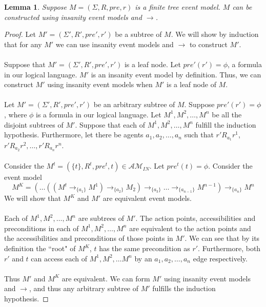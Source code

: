 \documentclass[12pt, a4paper, titlepage]{scrartcl}
\newtheorem{lemma}{Lemma}[subsection]
\numberwithin{equation}{section}
\newcommand{\eventClass}{\mathcal{AM}}
\newcommand{\insaneClass}{\eventClass_{IN}}
\begin{document}
\begin{lemma} \label{finTreeConstruct}
Suppose $M = (\Sigma, R, pre, r)$ is a finite tree event model.
$M$ can be constructed using insanity event models and $\to$.
\end{lemma}
\begin{proof}
Let $M' = (\Sigma', R', pre', r')$ be a subtree of $M$.
We will show by induction that for any $M'$ we can use insanity event models and $\to$ to
construct $M'$.\\
\\
Suppose that $M' = (\Sigma', R', pre', r')$ is a leaf node.
Let $pre'(r') = \phi$, a formula in our logical language.
$M'$ is an insanity event model by definition.
Thus, we can construct $M'$ using insanity event models when $M'$ is a leaf node of $M$.\\
\\
Let $M' = (\Sigma', R', pre', r')$ be an arbitrary subtree of $M$.
Suppose $pre'(r') = \phi$, where $\phi$ is a formula in our logical language.
Let $M^1, M^2, \ldots, M^n$ be all the disjoint subtrees of $M'$.
Suppose that each of $M^1, M^2, \ldots, M^n$ fulfill the induction hypothesis.
Furthermore, let there be agents $a_1, a_2, \ldots, a_n$ such that $r' R_{a_1} r^1$, $r' R_{a_2} r^2,
	\ldots, r' R_{a_n} r^n$.\\
\\
Consider the $M^t = (\{ t \}, R^t, pre^t, t) \in \insaneClass$.
Let $pre^t(t) = \phi$.
Consider the event model 
\[
M^K = (\ldots((M^t \to_{\{a_1\}} M ^ 1) \to_{\{a_2\}} M_2) \to_{\{a_3\}} \ldots
\to_{\{a_{n-1}\}} M^{n-1} ) \to_{\{a_n\}} M ^ n
\]
We will show that $M^K$ and $M'$ are equivalent event models.\\
\\
Each of $M^1, M^2, \ldots, M^n$ are subtrees of $M'$.
The action points, accessibilities and preconditions in each of $M^1, M^2, \ldots, M^n$ are
equivalent to the action points and the accessibilities and preconditions of those points in $M'$.
We can see that by its definition the ``root" of $M^K$, $t$ has the same precondition as $r'$.
Furthermore, both $r'$ and $t$ can access each of $M^1, M^2, \ldots M^n$ by an $a_1, a_2, \ldots, a_n$ edge
respectively.\\
\\
Thus $M'$ and $M^K$ are equivalent.
We can form $M'$ using insanity event models and $\to$, and thus any arbitrary subtree of $M'$
fulfills the induction hypothesis.
\end{proof}
\end{document}
